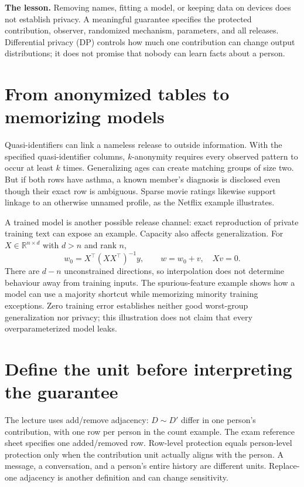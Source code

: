 \documentclass[11pt,letterpaper]{article}
\begin{document}

\textbf{The lesson.} Removing names, fitting a model, or keeping data on devices
does not establish privacy. A meaningful guarantee specifies the protected
contribution, observer, randomized mechanism, parameters, and all releases.
Differential privacy (DP) controls how much one contribution can change output
distributions; it does not promise that nobody can learn facts about a person.

\section*{From anonymized tables to memorizing models}
Quasi-identifiers can link a nameless release to outside information. With the
specified quasi-identifier columns, $k$-anonymity requires every observed pattern
to occur at least $k$ times. Generalizing ages can create matching groups of size
two. But if both rows have asthma, a known member's diagnosis is disclosed even
though their exact row is ambiguous. Sparse movie ratings likewise support linkage
to an otherwise unnamed profile, as the Netflix example illustrates.

A trained model is another possible release channel: exact reproduction of private
training text can expose an example. Capacity also affects generalization. For
$X\in\mathbb R^{n\times d}$ with $d>n$ and rank $n$,
\[
w_0=X^\top(XX^\top)^{-1}y,\qquad w=w_0+v,\quad Xv=0.
\]
There are $d-n$ unconstrained directions, so interpolation does not determine
behaviour away from training inputs. The spurious-feature example shows how a
model can use a majority shortcut while memorizing minority training exceptions.
Zero training error establishes neither good worst-group generalization nor
privacy; this illustration does not claim that every overparameterized model leaks.

\section*{Define the unit before interpreting the guarantee}
The lecture uses add/remove adjacency: $D\sim D'$ differ in one person's
contribution, with one row per person in the count example. The exam reference
sheet specifies one added/removed row. Row-level protection equals person-level
protection only when the contribution unit actually aligns with the person.
A message, a conversation, and a person's entire history are different units.
Replace-one adjacency is another definition and can change sensitivity.
\end{document}
